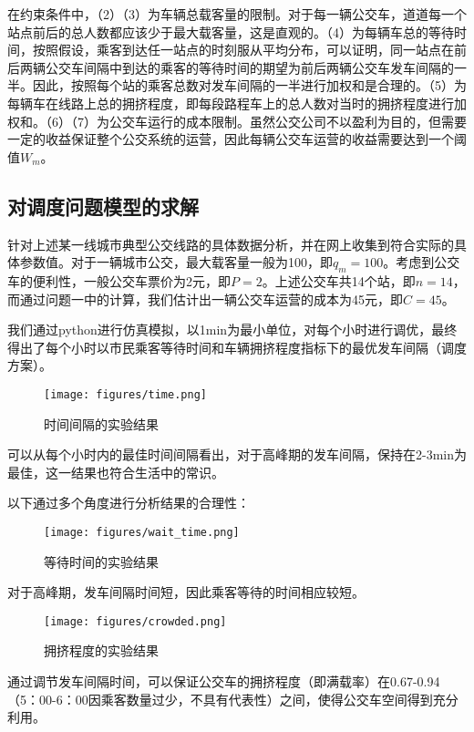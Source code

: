 \documentclass[UTF8]{ctexart}
\begin{document}
	在约束条件中，（2）（3）为车辆总载客量的限制。对于每一辆公交车，道道每一个站点前后的总人数都应该少于最大载客量，这是直观的。（4）为每辆车总的等待时间，按照假设，乘客到达任一站点的时刻服从平均分布，可以证明，同一站点在前后两辆公交车间隔中到达的乘客的等待时间的期望为前后两辆公交车发车间隔的一半。因此，按照每个站的乘客总数对发车间隔的一半进行加权和是合理的。（5）为每辆车在线路上总的拥挤程度，即每段路程车上的总人数对当时的拥挤程度进行加权和。（6）（7）为公交车运行的成本限制。虽然公交公司不以盈利为目的，但需要一定的收益保证整个公交系统的运营，因此每辆公交车运营的收益需要达到一个阈值$W_m$。
	
	\subsection{对调度问题模型的求解}
	
	针对上述某一线城市典型公交线路的具体数据分析，并在网上收集到符合实际的具体参数值。对于一辆城市公交，最大载客量一般为100，即$q_m=100$。考虑到公交车的便利性，一般公交车票价为2元，即$P=2$。上述公交车共14个站，即$n=14$，而通过问题一中的计算，我们估计出一辆公交车运营的成本为45元，即$C=45$。
	
	我们通过python进行仿真模拟，以1min为最小单位，对每个小时进行调优，最终得出了每个小时以市民乘客等待时间和车辆拥挤程度指标下的最优发车间隔（调度方案）。
	
	\begin{figure}[H]
		\centering
		\texttt{[image: figures/time.png]}
		\caption {时间间隔的实验结果}
	\end{figure}
	
	可以从每个小时内的最佳时间间隔看出，对于高峰期的发车间隔，保持在2-3min为最佳，这一结果也符合生活中的常识。
	
	以下通过多个角度进行分析结果的合理性：
	
	\begin{figure}[H]
		\centering
		\texttt{[image: figures/wait\_time.png]}
		\caption {等待时间的实验结果}
	\end{figure}
	
	对于高峰期，发车间隔时间短，因此乘客等待的时间相应较短。
	
	\begin{figure}[H]
		\centering
		\texttt{[image: figures/crowded.png]}
		\caption {拥挤程度的实验结果}
	\end{figure}
	
	通过调节发车间隔时间，可以保证公交车的拥挤程度（即满载率）在0.67-0.94（5：00-6：00因乘客数量过少，不具有代表性）之间，使得公交车空间得到充分利用。
	
\end{document}
